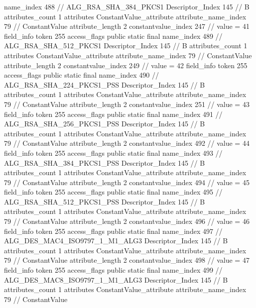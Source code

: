 {{{{{				name_index	488		// ALG_RSA_SHA_384_PKCS1
				Descriptor_Index	145		// B
				attributes_count	1
				attributes {
				ConstantValue_attribute {
					attribute_name_index	79		// ConstantValue
					attribute_length	2
					constantvalue_index	247		// value = 41
				}
				}
			}
			field_info {
				token	255
				access_flags	public static final
				name_index	489		// ALG_RSA_SHA_512_PKCS1
				Descriptor_Index	145		// B
				attributes_count	1
				attributes {
				ConstantValue_attribute {
					attribute_name_index	79		// ConstantValue
					attribute_length	2
					constantvalue_index	249		// value = 42
				}
				}
			}
			field_info {
				token	255
				access_flags	public static final
				name_index	490		// ALG_RSA_SHA_224_PKCS1_PSS
				Descriptor_Index	145		// B
				attributes_count	1
				attributes {
				ConstantValue_attribute {
					attribute_name_index	79		// ConstantValue
					attribute_length	2
					constantvalue_index	251		// value = 43
				}
				}
			}
			field_info {
				token	255
				access_flags	public static final
				name_index	491		// ALG_RSA_SHA_256_PKCS1_PSS
				Descriptor_Index	145		// B
				attributes_count	1
				attributes {
				ConstantValue_attribute {
					attribute_name_index	79		// ConstantValue
					attribute_length	2
					constantvalue_index	492		// value = 44
				}
				}
			}
			field_info {
				token	255
				access_flags	public static final
				name_index	493		// ALG_RSA_SHA_384_PKCS1_PSS
				Descriptor_Index	145		// B
				attributes_count	1
				attributes {
				ConstantValue_attribute {
					attribute_name_index	79		// ConstantValue
					attribute_length	2
					constantvalue_index	494		// value = 45
				}
				}
			}
			field_info {
				token	255
				access_flags	public static final
				name_index	495		// ALG_RSA_SHA_512_PKCS1_PSS
				Descriptor_Index	145		// B
				attributes_count	1
				attributes {
				ConstantValue_attribute {
					attribute_name_index	79		// ConstantValue
					attribute_length	2
					constantvalue_index	496		// value = 46
				}
				}
			}
			field_info {
				token	255
				access_flags	public static final
				name_index	497		// ALG_DES_MAC4_ISO9797_1_M1_ALG3
				Descriptor_Index	145		// B
				attributes_count	1
				attributes {
				ConstantValue_attribute {
					attribute_name_index	79		// ConstantValue
					attribute_length	2
					constantvalue_index	498		// value = 47
				}
				}
			}
			field_info {
				token	255
				access_flags	public static final
				name_index	499		// ALG_DES_MAC8_ISO9797_1_M1_ALG3
				Descriptor_Index	145		// B
				attributes_count	1
				attributes {
				ConstantValue_attribute {
					attribute_name_index	79		// ConstantValue
}}}}}}}
